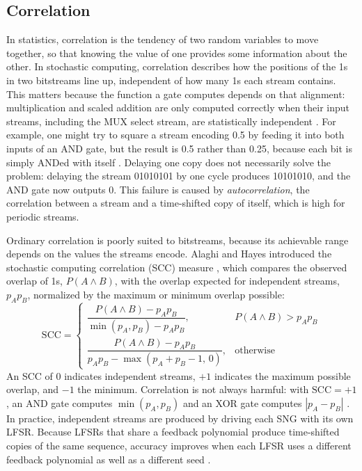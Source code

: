 \documentclass[conference]{IEEEtran}
\begin{document}
\subsection{Correlation}

In statistics, correlation is the tendency of two random variables to move
together, so that knowing the value of one provides some information about the
other. In stochastic computing, correlation describes how the positions of
the 1s in two bitstreams line up, independent of how many 1s each stream
contains. This matters because the function a gate computes depends on that
alignment: multiplication and scaled addition are only computed correctly when
their input streams, including the MUX select stream, are statistically independent \cite{sn_stream_independance}. For example, one might try to
square a stream encoding 0.5 by feeding it into both inputs of an AND gate,
but the result is 0.5 rather than 0.25, because each bit is simply ANDed with
itself \cite{survey_of_stochastic_computing}. Delaying one copy does not
necessarily solve the problem: delaying the stream 01010101 by one cycle
produces 10101010, and the AND gate now outputs 0. This failure is caused by
\emph{autocorrelation}, the correlation between a stream and a time-shifted
copy of itself, which is high for periodic streams.

Ordinary correlation is poorly suited to bitstreams, because its
achievable range depends on the values the streams encode. Alaghi and Hayes
introduced the stochastic computing correlation (SCC) measure
\cite{sn_stream_independance}, which compares the observed overlap of 1s, $P(A \wedge B)$, with
the overlap expected for independent streams, $p_A p_B$, normalized by the
maximum or minimum overlap possible:
\begin{equation}
\mathrm{SCC} =
\begin{cases}
\dfrac{P(A \wedge B) - p_A p_B}{\min(p_A, p_B) - p_A p_B}, & P(A \wedge B) > p_A p_B \\[2ex]
\dfrac{P(A \wedge B) - p_A p_B}{p_A p_B - \max(p_A + p_B - 1,\, 0)}, & \text{otherwise}
\end{cases}
\end{equation}
An SCC of 0 indicates independent streams, $+1$ indicates the maximum possible
overlap, and $-1$ the minimum. Correlation is not always harmful: with
$\mathrm{SCC} = +1$, an AND gate computes $\min(p_A, p_B)$ and an XOR gate
computes $|p_A - p_B|$ \cite{sn_stream_independance}. In practice, independent streams are
produced by driving each SNG with its own LFSR. Because LFSRs that share a
feedback polynomial produce time-shifted copies of the same sequence, accuracy
improves when each LFSR uses a different feedback polynomial as well as a
different seed \cite{LFSR_seeding}.
\end{document}
